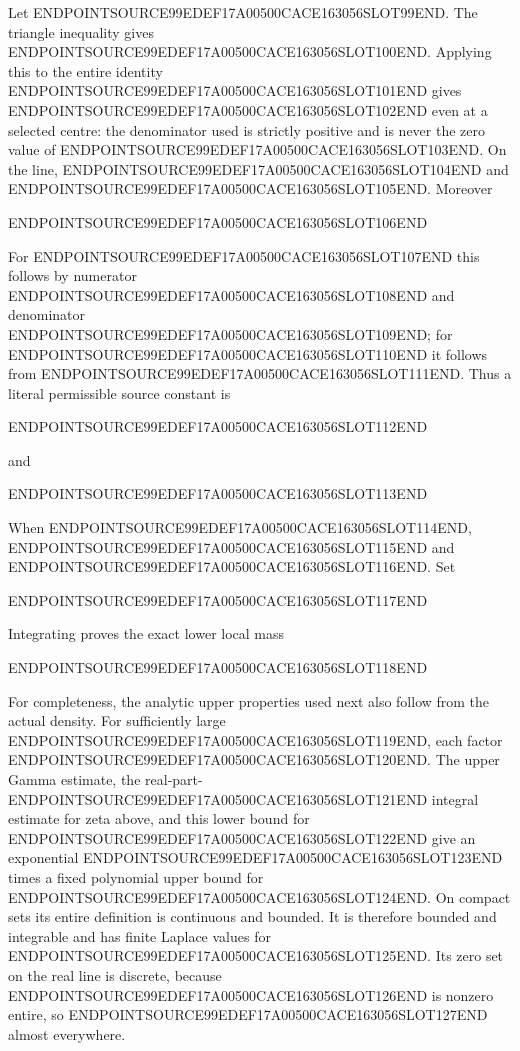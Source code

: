 Let ENDPOINTSOURCE99EDEF17A00500CACE163056SLOT99END. The triangle inequality gives ENDPOINTSOURCE99EDEF17A00500CACE163056SLOT100END. Applying this to the entire identity ENDPOINTSOURCE99EDEF17A00500CACE163056SLOT101END gives ENDPOINTSOURCE99EDEF17A00500CACE163056SLOT102END even at a selected centre: the denominator used is strictly positive and is never the zero value of ENDPOINTSOURCE99EDEF17A00500CACE163056SLOT103END. On the line, ENDPOINTSOURCE99EDEF17A00500CACE163056SLOT104END and ENDPOINTSOURCE99EDEF17A00500CACE163056SLOT105END. Moreover

ENDPOINTSOURCE99EDEF17A00500CACE163056SLOT106END

For ENDPOINTSOURCE99EDEF17A00500CACE163056SLOT107END this follows by numerator ENDPOINTSOURCE99EDEF17A00500CACE163056SLOT108END and denominator ENDPOINTSOURCE99EDEF17A00500CACE163056SLOT109END; for ENDPOINTSOURCE99EDEF17A00500CACE163056SLOT110END it follows from ENDPOINTSOURCE99EDEF17A00500CACE163056SLOT111END. Thus a literal permissible source constant is

ENDPOINTSOURCE99EDEF17A00500CACE163056SLOT112END

and

ENDPOINTSOURCE99EDEF17A00500CACE163056SLOT113END

When ENDPOINTSOURCE99EDEF17A00500CACE163056SLOT114END, ENDPOINTSOURCE99EDEF17A00500CACE163056SLOT115END and ENDPOINTSOURCE99EDEF17A00500CACE163056SLOT116END. Set

ENDPOINTSOURCE99EDEF17A00500CACE163056SLOT117END

Integrating proves the exact lower local mass

ENDPOINTSOURCE99EDEF17A00500CACE163056SLOT118END

For completeness, the analytic upper properties used next also follow from the actual density. For sufficiently large ENDPOINTSOURCE99EDEF17A00500CACE163056SLOT119END, each factor ENDPOINTSOURCE99EDEF17A00500CACE163056SLOT120END. The upper Gamma estimate, the real-part-ENDPOINTSOURCE99EDEF17A00500CACE163056SLOT121END integral estimate for zeta above, and this lower bound for ENDPOINTSOURCE99EDEF17A00500CACE163056SLOT122END give an exponential ENDPOINTSOURCE99EDEF17A00500CACE163056SLOT123END times a fixed polynomial upper bound for ENDPOINTSOURCE99EDEF17A00500CACE163056SLOT124END. On compact sets its entire definition is continuous and bounded. It is therefore bounded and integrable and has finite Laplace values for ENDPOINTSOURCE99EDEF17A00500CACE163056SLOT125END. Its zero set on the real line is discrete, because ENDPOINTSOURCE99EDEF17A00500CACE163056SLOT126END is nonzero entire, so ENDPOINTSOURCE99EDEF17A00500CACE163056SLOT127END almost everywhere.

